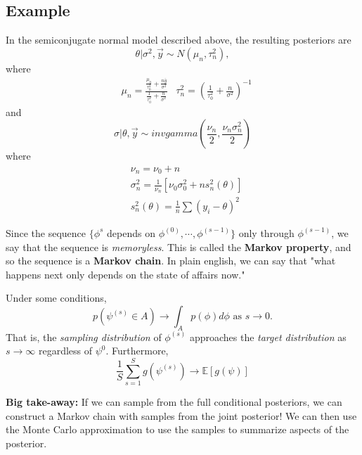 \documentclass[titlepage, 12pt, leqno]{article}
\begin{document}
\subsection{Example}
In the semiconjugate normal model described above, the resulting posteriors are
\[
\theta|\sigma^{2},\vec y \sim N(\mu_{n}, \tau_{n}^{2}),
\]
where 
\begin{align*}
    &\mu_{n} = \frac{\frac{\mu_{0}}{\tau_{0}^{2}} + \frac{n\bar y}{\sigma^{2}}}
    {\frac{1}{\tau_{0}^{2}} + \frac{n}{\sigma^{2}}}
    & \tau_{n}^{2} = \left(\frac{1}{\tau_{0}^{2}} + \frac{n}{\sigma^{2}}
        \right)^{-1}
\end{align*}
and
\[
\sigma|\theta, \vec y \sim  invgamma\left(\frac{\nu_{n}}{2}, 
    \frac{\nu_{n}\sigma^{2}_{n}}{2}\right)
\]
where
\begin{align*}
    &\nu_{n} = \nu_{0} + n \\
    &\sigma_{n}^{2} = \frac{1}{\nu_{n}}[\nu_{0}
    \sigma^{2}_{0} + ns_{n}^{2}(\theta)]\\
    &s_{n}^{2}(\theta) = \frac{1}{n}\sum (y_{i}-\theta)^{2}
\end{align*}

\begin{definition}
    Since the sequence $\{\phi^{s}$ depends on $\phi^{(0)}, \cdots ,
    \phi^{(s-1)}\}$ only through $\phi^{(s-1)}$, we say that the sequence is
    \textit{memoryless}. This is called the \textbf{Markov property}, and so 
    the sequence is a \textbf{Markov chain}. In plain english, we can say that
    "what happens next only depends on the state of affairs now."
\end{definition}

Under some conditions,
\[
p(\psi^{(s)}\in A) \rightarrow \int_{A}p(\phi)d \phi \text{ as }s\rightarrow 0.
\]
That is, the \textit{sampling distribution} of $\phi^{(s)}$ approaches the
\textit{target distribution} as $s \rightarrow \infty$ regardless of 
$\psi^{0}$. Furthermore, 
\[
    \frac{1}{S}\sum_{s=1}^{S}g(\psi^{(s)}) \rightarrow \mathbb{E}[g(\psi)]
\]
\begin{note}
    \textbf{Big take-away:} If we can sample from the full conditional
    posteriors, we can construct a Markov chain with samples from the joint
    posterior! We can then use the Monte Carlo approximation to use the samples
    to summarize aspects of the posterior.
\end{note}

\pagebreak
\end{document}
